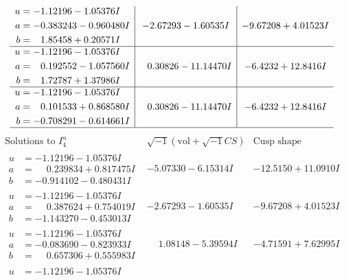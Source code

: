 \documentclass[1p]{elsarticle_modified}
\theoremstyle{definition}
\newcommand{\I}{\sqrt{-1}}
\begin{document}
$$\begin{array}{c|c|c}
\begin{aligned}
u &= -1.12196 - 1.05376 I \\
a &= -0.383243 - 0.960480 I \\
b &= \phantom{-}1.85458 + 0.20571 I\end{aligned}
 & -2.67293 - 1.60535 I & -9.67208 + 4.01523 I \\ \hline\begin{aligned}
u &= -1.12196 - 1.05376 I \\
a &= \phantom{-}0.192552 - 1.057560 I \\
b &= \phantom{-}1.72787 + 1.37986 I\end{aligned}
 & \phantom{-}0.30826 - 11.14470 I & -6.4232 + 12.8416 I \\ \hline\begin{aligned}
u &= -1.12196 - 1.05376 I \\
a &= \phantom{-}0.101533 + 0.868580 I \\
b &= -0.708291 - 0.614661 I\end{aligned}
 & \phantom{-}0.30826 - 11.14470 I & -6.4232 + 12.8416 I\\
 \hline 
 \end{array}$$\newpage$$\begin{array}{c|c|c}  
\text{Solutions to }I^u_{4}& \I (\text{vol} + \sqrt{-1}CS) & \text{Cusp shape}\\
 \hline 
\begin{aligned}
u &= -1.12196 - 1.05376 I \\
a &= \phantom{-}0.239834 + 0.817475 I \\
b &= -0.914102 - 0.480431 I\end{aligned}
 & -5.07330 - 6.15314 I & -12.5150 + 11.0910 I \\ \hline\begin{aligned}
u &= -1.12196 - 1.05376 I \\
a &= \phantom{-}0.387624 + 0.754019 I \\
b &= -1.143270 - 0.453013 I\end{aligned}
 & -2.67293 - 1.60535 I & -9.67208 + 4.01523 I \\ \hline\begin{aligned}
u &= -1.12196 - 1.05376 I \\
a &= -0.083690 - 0.823933 I \\
b &= \phantom{-}0.657306 + 0.555983 I\end{aligned}
 & \phantom{-}1.08148 - 5.39594 I & -4.71591 + 7.62995 I \\ \hline\begin{aligned}
u &= -1.12196 - 1.05376 I \\

\end{aligned}
\end{array}$$
\end{document}
